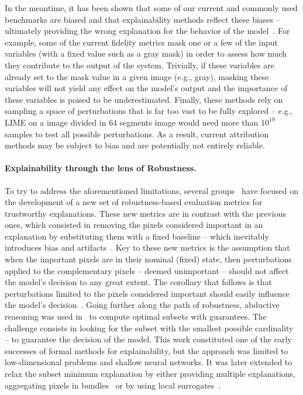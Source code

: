 In the meantime, it has been shown that some of our current and commonly used benchmarks are biased and that explainability methods reflect these biases -- ultimately providing the wrong explanation for the behavior of the model~\cite{sturmfels2020visualizing,hsieh2020evaluations,hase2021out}.
For example, some of the current fidelity metrics \cite{petsiuk2018rise, aggregating2020,jacovi2020towards,hedstrom2022quantus,fel2022xplique} mask one or a few of the input variables (with a fixed value such as a gray mask) in order to assess how much they contribute to the output of the system. Trivially, if these variables are already set to the mask value in a given image (e.g., gray), masking these variables will not yield any effect on the model's output and the importance of these variables is poised to be underestimated. 
Finally, these methods rely on sampling a space of perturbations that is far too vast to be fully explored -- e.g., LIME on a image divided in $64$ segments image would need more than $10^{19}$ samples to test all possible perturbations. 
As a result, current attribution methods may be subject to bias and are potentially not entirely reliable.

\paragraph{Explainability through the lens of Robustness.} To try to address the aforementioned limitations, several groups~\cite{ignatiev2019abduction, ignatiev2019relating, slack2021reliable, hsieh2020evaluations, boopathy2020proper, lin2019explanations, fel2020representativity} have focused on the development of a new set of robustness-based evaluation metrics for trustworthy explanations. 
These new metrics are in contrast with the previous ones, which consisted in removing the pixels considered important in an explanation by substituting them with a fixed baseline -- which inevitably introduces bias and artifacts~\cite{hsieh2020evaluations,sturmfels2020visualizing,haug2021baselines,kindermans2019reliability,hase2021out}. 
Key to these new metrics is the assumption that when the important pixels are in their nominal (fixed) state, then perturbations applied to the complementary pixels -- deemed unimportant -- should not affect the model's decision to any great extent. The corollary that follows is that perturbations limited to the pixels considered important should easily influence the model's decision~\cite{lin2019explanations,hsieh2020evaluations}.
Going further along the path of robustness, abductive reasoning was used in~\cite{ignatiev2019abduction} to compute optimal subsets with guarantees.  The challenge consists  in looking for the subset with the smallest possible  cardinality -- to guarantee the decision of the model. This work constituted one of the early successes of formal methods for explainability, but the approach was limited to low-dimensional problems and shallow neural networks. It was later extended to relax the subset minimum explanation by either providing multiple explanations, aggregating pixels in bundles~\cite{bassan2022towards} or by using local surrogates~\cite{boumazouza2021asteryx}.

